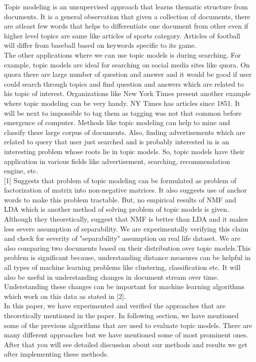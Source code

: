 \documentclass[a4paper,11pt]{article}
\begin{document}
Topic modeling is an unsupervised approach that learns thematic structure from documents. It is a general observation that given a collection of documents, there are atleast few words that helps to differentiate one document from other even if higher level topics are same like articles of sports category. Articles of football will differ from baseball based on keywords specific to its game. \\

The other applications where we can use topic models is during searching. For example, topic models are ideal for searching on social media sites like quora. On quora there are large number of question and answer and it would be good if user could search through topics and find question and answers which are related to his topic of interest. Organizations like New York Times present another example where topic modeling can be very handy. NY Times has articles since 1851. It will be next to impossible to tag them as tagging was not that common before emergence of computer. Methods like topic modeling can help to mine and classify these large corpus of documents. Also, finding advertisements which are related to query that user just searched and is probably interested in is an interesting problem whose roots lie in topic models. So, topic models have their application in various fields like advertisement, searching, recommendation engine, etc. \\

[1] Suggests that problem of topic modeling can be formulated as problem of factorization of matrix into non-negative matrices. It also suggests use of anchor words to make this problem tractable. But, no empirical results of NMF and LDA which is another method of solving problem of topic models is given. Although they theoretically, suggest that NMF is better than LDA and it makes less severe assumption of separability. We are experimentally verifying this claim and check for severity of "separability" assumption on real life dataset. We are also comparing two documents based on their distribution over topic models.This problem is significant because, understanding distance measures can be helpful in all types of machine learning problems like clustering, classification etc. It will also be useful in understanding changes in document stream over time. Understanding these changes can be important for machine learning algorithms which work on this data as stated in [2]. \\

In this paper, we have experimented and verified the approaches that are theoretically mentioned in the paper. In following section, we have mentioned some of the previous algorithms that are used to evaluate topic models. There are many different approaches but we have mentioned some of most prominent ones. After that you will see detailed discussion about our methods and results we get after implementing these methods. \\
\end{document}
